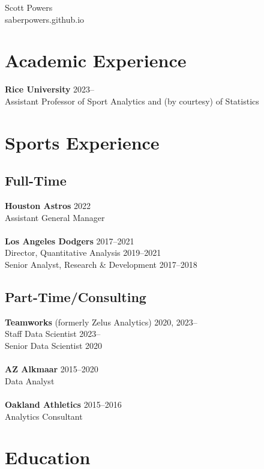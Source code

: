 \documentclass{article}
\begin{document}
\begin{center}
{\huge \sc Scott Powers}\\
saberpowers.github.io
\end{center}


\section*{\sc Academic Experience}

{\bf Rice University} \hfill 2023--\\
Assistant Professor of Sport Analytics and (by courtesy) of Statistics

\section*{\sc Sports Experience}

\subsection*{\sc Full-Time}

{\bf Houston Astros} \hfill 2022\\
Assistant General Manager\\
~\\
{\bf Los Angeles Dodgers} \hfill 2017--2021\\
Director, Quantitative Analysis \hfill {\color{gray} 2019--2021}\\
Senior Analyst, Research \& Development \hfill {\color{gray} 2017--2018}

\subsection*{\sc Part-Time/Consulting}

{\bf Teamworks} (formerly Zelus Analytics) \hfill 2020, 2023--\\
Staff Data Scientist \hfill {\color{gray}2023--}\\
Senior Data Scientist \hfill {\color{gray}2020}\\
~\\
{\bf AZ Alkmaar} \hfill 2015--2020\\
Data Analyst\\
~\\
{\bf Oakland Athletics} \hfill 2015--2016\\
Analytics Consultant

\section*{\sc Education}
\end{document}
